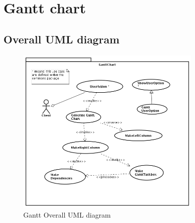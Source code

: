 












\chapter{Gantt chart}
\section*{Overall UML diagram}
\begin{figure}[h!] \centering
\includegraphics[width=0.8\textwidth]{../Milestone2-UseCases/Gantt/img/GanttChart.png}
\caption{Gantt Overall UML diagram}
\label{fig:ganttDiagram}
\end{figure}








